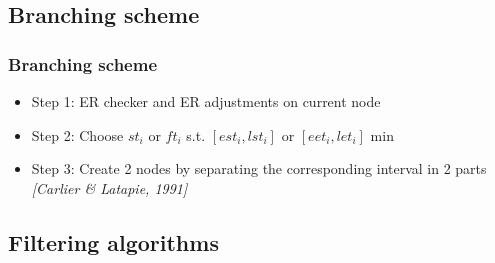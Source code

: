 \subsection{Branching scheme}

\begin{frame}
  \frametitle{Branching scheme }
  \begin{itemize}
    \vfill
  \item Step 1: ER checker and ER adjustments on current node 
    \vfill    
    \pause
  \item Step 2: Choose $st_i$ or $ft_i$ s.t. $[est_i,lst_i]$ or
    $[eet_i,let_i]$ min
    \vfill
    \pause
  \item Step 3: Create 2 nodes by separating the corresponding
    interval in 2 parts  {\small \it \color{gray!50!black!50} [Carlier
      \& Latapie, 1991]} 
  \end{itemize}
  \begin{overlayarea}{\textwidth}{4cm}
  \end{overlayarea}
  \vfill
\end{frame}

\subsection{Filtering algorithms}


